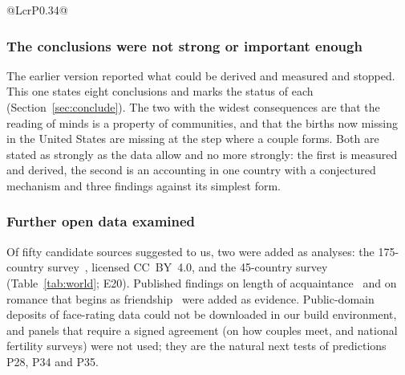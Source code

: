 \begin{table}[t]
\caption{Stated ideals and partnership across countries. K: 175-country survey~\cite{kowal2025}, countries with at least 50
men and 50 women (150 of each for the partnership row). W: 45-country survey~\cite{walter2020}. Differences $d$ are in pooled
standard deviations. No country is named or ranked.}\label{tab:world}
\scriptsize
\begin{tabularx}{\textwidth}{@{}LcrP{0.34\textwidth}@{}}
\toprule
{}
\bottomrule
\end{tabularx}
\end{table}

\subsubsection{The conclusions were not strong or important enough}
The earlier version reported what could be derived and measured and stopped. This one states eight conclusions and marks
the status of each (Section~\ref{sec:conclude}). The two with the widest consequences are that the reading of minds is a
property of communities, and that the births now missing in the United States are missing at the step where a couple
forms. Both are stated as strongly as the data allow and no more strongly: the first is measured and derived, the second
is an accounting in one country with a conjectured mechanism and three findings against its simplest form.

\subsubsection{Further open data examined}
Of fifty candidate sources suggested to us, two were added as analyses: the 175-country survey~\cite{kowal2025}, licensed
CC~BY~4.0, and the 45-country survey~\cite{walter2020} (Table~\ref{tab:world}; E20). Published findings on length of
acquaintance~\cite{hunt2015} and on romance that begins as friendship~\cite{stinson2022} were added as evidence. Public-domain
deposits of face-rating data could not be downloaded in our build environment, and panels that require a signed agreement
(on how couples meet, and national fertility surveys) were not used; they are the natural next tests of predictions P28,
P34 and P35.
